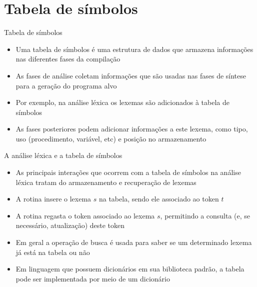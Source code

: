 \section{Tabela de símbolos}

\begin{frame}[fragile]{Tabela de símbolos}

    \begin{itemize}
        \item Uma tabela de símbolos é uma estrutura de dados que armazena informações nas diferentes fases da compilação

        \item As fases de análise coletam informações que são usadas nas fases de síntese para a geração do programa alvo

        \item Por exemplo, na análise léxica os lexemas são adicionados à tabela de símbolos

        \item As fases posteriores podem adicionar informações a este lexema, como tipo, uso (procedimento, variável, etc) e posição no armazenamento
    \end{itemize}

\end{frame}

\begin{frame}[fragile]{A análise léxica e a tabela de símbolos}

    \begin{itemize}
        \item As principais interações que ocorrem com a tabela de símbolos na análise léxica tratam do armazenamento e recuperação de lexemas

        \item A rotina  insere o lexema $s$ na tabela, sendo ele associado ao token $t$

        \item A rotina  regasta o token associado ao lexema $s$, permitindo a consulta (e, se necessário, atualização) deste token

        \item Em geral a operação de busca é usada para saber se um determinado lexema já está na tabela ou não

        \item Em linguagem que possuem dicionários em sua biblioteca padrão, a tabela pode ser implementada por meio de um dicionário
    \end{itemize}

\end{frame}

